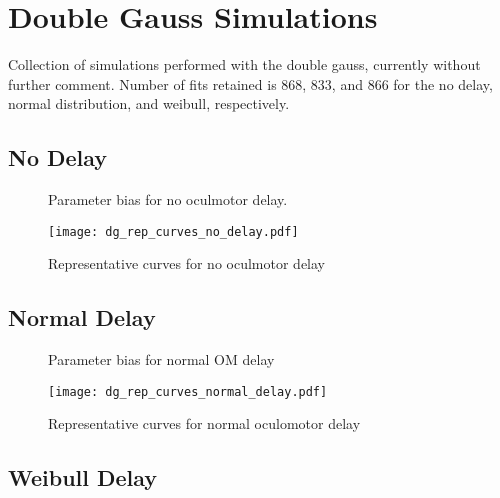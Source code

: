 \section*{Double Gauss Simulations}

Collection of simulations performed with the double gauss, currently without further comment. Number of fits retained is 868, 833, and 866 for the no delay, normal distribution, and weibull, respectively.

\subsection{No Delay}


\begin{figure}[H]
\centering
\caption{Parameter bias for no oculmotor delay. }
\label{fig:dg_par_bias_no_delay}
\end{figure}

\begin{figure}[H]
\centering
\texttt{[image: dg\_rep\_curves\_no\_delay.pdf]}
\caption{Representative curves for no oculmotor delay}
\label{fig:dg_rep_curves_no_delay}
\end{figure}


\subsection{Normal Delay}


\begin{figure}[H]
\centering
\caption{Parameter bias for normal OM delay}
\label{fig:dg_par_bias_normal_delay}
\end{figure}

\begin{figure}[H]
\centering
\texttt{[image: dg\_rep\_curves\_normal\_delay.pdf]}
\caption{Representative curves for normal oculomotor delay}
\label{fig:dg_rep_curves_normal_delay}
\end{figure}

\subsection{Weibull Delay}

